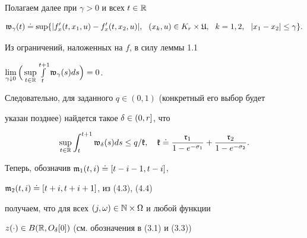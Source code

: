 Полагаем далее при $\gamma>0$ и всех $t\in\Bbb R$


\begin{equation}


\frak w_{\gamma}(t)\doteq\sup\{|f'_{x}(t,x_{1},u)-f'_{x}(t,x_{2},u)|,


\ \ (x_{k},u)\in K_{r}\times\frak U,\ \ k=1,2,\ \ |x_{1}-x_{2}|\le\gamma\}.


\end{equation}


Из ограничений, наложенных на $f$, в силу леммы 1.1


$\lim\lt_{\gamma\downto 0}


\Big(\sup\lt_{t\in\R}\int\lt_{t}^{t+1}\frak w_{\gamma}(s)ds\Big)=0$.


Следовательно, для заданного $q\in (0,1)$ (конкретный его выбор будет


указан позднее) найдется такое $\delta\in (0,r]$, что


\begin{equation}


\sup\lt_{t\in\R}\int_{t}^{t+1}\frak w_{\dl}(s)ds\le q/\frak k,\quad


\frak k\doteq\frac{\frak r_{1}}{1-e^{-\sigma_{1}}}+


\frac{\frak r_{2}}{1-e^{-\sigma_{2}}}.


\end{equation}


Теперь, обозначив $\frak m_{1}(t,i)\doteq [t-i-1,t-i]$,


$\frak m_{2}(t,i)\doteq [t+i,t+i+1]$, из (4.3), (4.4)


получаем, что для всех $(j,\omega)\in\Bbb N\times\Omega$ и любой функции


$z(\cdot)\in B(\Bbb R,O_{\delta}[0])$ (см. обозначения в (3.1) и (3.3))


